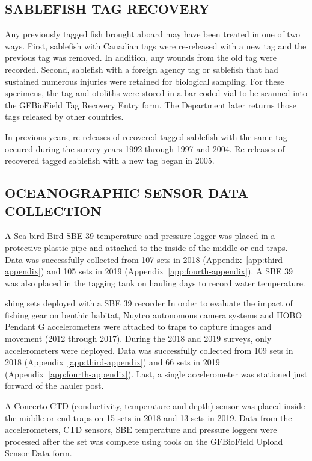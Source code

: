 \documentclass[12pt]{article}\usepackage[]{graphicx}\usepackage[]{color}
\begin{document}
\hypertarget{sablefish-tag-recovery}{%
\subsection{SABLEFISH TAG RECOVERY}\label{sablefish-tag-recovery}}

Any previously tagged fish brought aboard may have been treated in one of two ways. First, sablefish with Canadian tags were re-released with a new tag and the previous tag was removed. In addition, any wounds from the old tag were recorded. Second, sablefish with a foreign agency tag or sablefish that had sustained numerous injuries were retained for biological sampling. For these specimens, the tag and otoliths were stored in a bar-coded vial to be scanned into the GFBioField Tag Recovery Entry form. The Department later returns those tags released by other countries.

In previous years, re-releases of recovered tagged sablefish with the same tag occured during the survey years 1992 through 1997 and 2004. Re-releases of recovered tagged sablefish with a new tag began in 2005.

\hypertarget{oceanographic-sensor-data-collection}{%
\subsection{OCEANOGRAPHIC SENSOR DATA COLLECTION}\label{oceanographic-sensor-data-collection}}

A Sea-bird Bird SBE 39 temperature and pressure logger was placed in a protective plastic pipe and attached to the inside of the middle or end traps. Data was successfully collected from 107 sets in 2018 (Appendix~\ref{app:third-appendix}) and 105 sets in 2019 (Appendix~\ref{app:fourth-appendix}). A SBE 39 was also placed in the tagging tank on hauling days to record water temperature.

shing sets deployed with a SBE 39 recorder In order to evaluate the impact of fishing gear on benthic habitat, Nuytco autonomous camera systems and HOBO Pendant G accelerometers were attached to traps to capture images and movement (2012 through 2017). During the 2018 and 2019 surveys, only accelerometers were deployed. Data was successfully collected from 109 sets in 2018 (Appendix~\ref{app:third-appendix}) and 66 sets in 2019 (Appendix~\ref{app:fourth-appendix}). Last, a single accelerometer was stationed just forward of the hauler post.

A Concerto CTD (conductivity, temperature and depth) sensor was placed inside the middle or end traps on 15 sets in 2018 and 13 sets in 2019. Data from the accelerometers, CTD sensors, SBE temperature and pressure loggers were processed after the set was complete using tools on the GFBioField Upload Sensor Data form.
\end{document}
